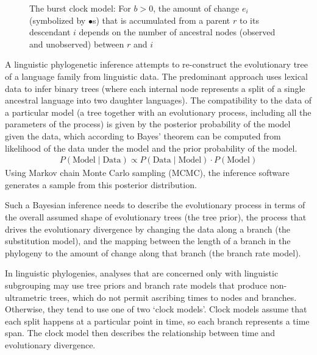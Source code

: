 \documentclass[]{rsos}%
\begin{document}
\begin{figure}
    \caption{The burst clock model: For $b>0$, the amount of change $e_i$ (symbolized
      by $\bullet$s) that is
      accumulated from a parent $r$ to its descendant $i$ depends on the number of
      ancestral nodes (observed and unobserved) between $r$ and $i$}
    \label{f:burstclock}
\end{figure}
A linguistic phylogenetic inference attempts to re-construct the evolutionary
tree of a language family from linguistic data. The predominant approach uses
lexical data to infer binary trees (where each internal node represents a split
of a single ancestral language into two daughter languages). The compatibility to the data
of a particular model (a tree together with an evolutionary process, including
all the parameters of the process) is given by the posterior probability of the
model given the data, which according to Bayes' theorem can be computed from
likelihood of the data under the model and the prior probability of the model.
\begin{align}
    P(\text{Model}\mid\text{Data}) \propto P(\text{Data}\mid\text{Model}) \cdot P(\text{Model})
\end{align}
Using Markov chain Monte Carlo sampling (MCMC), the inference software generates
a sample from this posterior distribution.

Such a Bayesian inference needs to describe the evolutionary process in terms of
the overall assumed shape of evolutionary trees (the tree prior), the process
that drives the evolutionary divergence by changing the data along a branch (the
substitution model), and the mapping between the length of a branch in the
phylogeny to the amount of change along that branch (the branch rate model).

In linguistic phylogenies, analyses that are concerned only with linguistic
subgrouping may use tree priors and branch rate models that produce
non-ultrametric trees, which do not permit ascribing times to nodes and
branches. Otherwise, they tend to use one of two ‘clock models’. Clock models
assume that each split happens at a particular point in time, so each branch
represents a time span. The clock model then describes the relationship between time and
evolutionary divergence.
\end{document}
